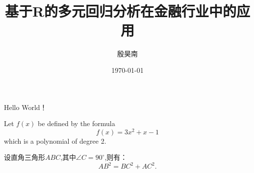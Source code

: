 \documentclass{ctexart}%
\title{\heiti 基于R的多元回归分析在金融行业中的应用}
\author{\kaishu 殷昊南}
\date{\today}
\newcommand\degree{^\circ}
\begin{document}
	\maketitle
	Hello World！
	
	Let $f(x)$ be defined by the formula
	$$f(x)=3x^2+x-1$$which is a polynomial of degree 2.
	
	设直角三角形$ABC$,其中$\angle C=90\degree$,则有：
	\begin{equation}%
	AB^2=BC^2+AC^2.
	\end{equation}
\end{document}
